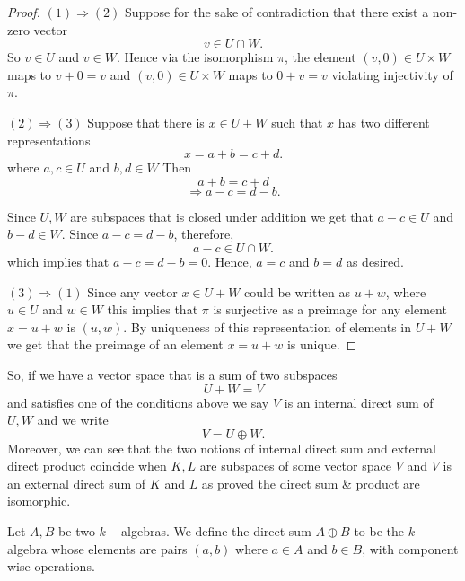 \begin{proof}
$(1)\Rightarrow(2)$ Suppose for the sake of contradiction that there exist a non-zero vector
\[
v\in U\cap W.
\]
So $v\in U$ and $v\in W$. Hence via the isomorphism $\pi$, the element $(v,0) \in U \times W$ maps to $v+0 = v$ and $(v,0) \in U \times W$ maps to $0+v = v$ violating injectivity of $\pi$.

$(2)\Rightarrow(3)$ Suppose that there is $x\in U+W$ such that $x$ has two different representations
\[
x=a+b=c+d.
\]
where $a,c \in U$ and $b,d \in W$ 
Then
\[
a+b=c+d
\]
\[
\Rightarrow a-c=d-b.
\]

Since $U,W$ are subspaces that is closed under addition we get that 
$a-c\in U$
and
$b-d\in W.$ Since $a-c=d-b$, therefore,
\[
a-c\in U\cap W.\] 
which implies that $a-c= d-b= 0$. Hence, $a=c$ and $b=d$ as desired.


$(3)\Rightarrow(1)$ Since any vector $ x \in U +W$ could be written as $u+w$, where $u \in U$ and $w \in W$ this implies that $\pi$ is surjective as a preimage for any element $x = u+w$ is $(u,w)$. By uniqueness of this representation of elements in $U+W$ we get that the preimage of an element $x = u+w$ is unique.
\end{proof}

So, if we have a vector space that is a sum of two subspaces
\[
U+W=V
\]
and satisfies one of the conditions above we say $V$ is an internal direct sum of $U,W$ and we write
\[
V=U\oplus W.
\]
Moreover, we can see that the two notions of internal direct sum and external direct product coincide when $K,L$ are subspaces of some vector space $V$ and $V$ is an external direct sum of $K$ and $L$ as proved the direct sum \& product are isomorphic.


\begin{definition}
    Let $A,B$ be two $k-$algebras. We define the direct sum $A \oplus B$ to be the $k-$algebra whose elements are pairs $(a,b)$ where $a \in A$ and $b \in B$, with component wise operations.
\end{definition}


